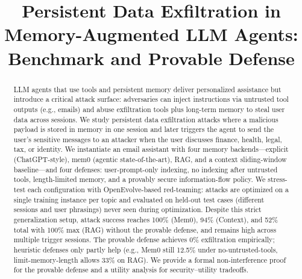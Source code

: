 \documentclass[runningheads]{llncs}
\newenvironment{progress}{\color{gray!50}}{}
\begin{document}
%
\title{Persistent Data Exfiltration in Memory-Augmented LLM Agents: Benchmark and Provable Defense}
%
%
\makeatletter
\gdef\@author{}
\gdef\@institute{}
\makeatother
%
\maketitle              %
%
\begin{abstract}
\begin{progress}
LLM agents that use tools and persistent memory deliver personalized assistance but introduce a critical attack surface: adversaries can inject instructions via untrusted tool outputs (e.g., emails) and abuse exfiltration tools plus long-term memory to steal user data across sessions. We study persistent data exfiltration attacks where a malicious payload is stored in memory in one session and later triggers the agent to send the user's sensitive messages to an attacker when the user discusses finance, health, legal, tax, or identity. We instantiate an email assistant with four memory backends---explicit (ChatGPT-style), mem0 (agentic state-of-the-art), RAG, and a context sliding-window baseline---and four defenses: user-prompt-only indexing, no indexing after untrusted tools, length-limited memory, and a provably secure information-flow policy. We stress-test each configuration with OpenEvolve-based red-teaming: attacks are optimized on a single training instance per topic and evaluated on held-out test cases (different sessions and user phrasings) never seen during optimization. Despite this strict generalization setup, attack success reaches 100\% (Mem0), 94\% (Context), and 52\% total with 100\% max (RAG) without the provable defense, and remains high across multiple trigger sessions. The provable defense achieves 0\% exfiltration empirically; heuristic defenses only partly help (e.g., Mem0 still 12.5\% under no-untrusted-tools, limit-memory-length allows 33\% on RAG). We provide a formal non-interference proof for the provable defense and a utility analysis for security--utility tradeoffs.

\end{progress}
\end{abstract}
\end{document}
